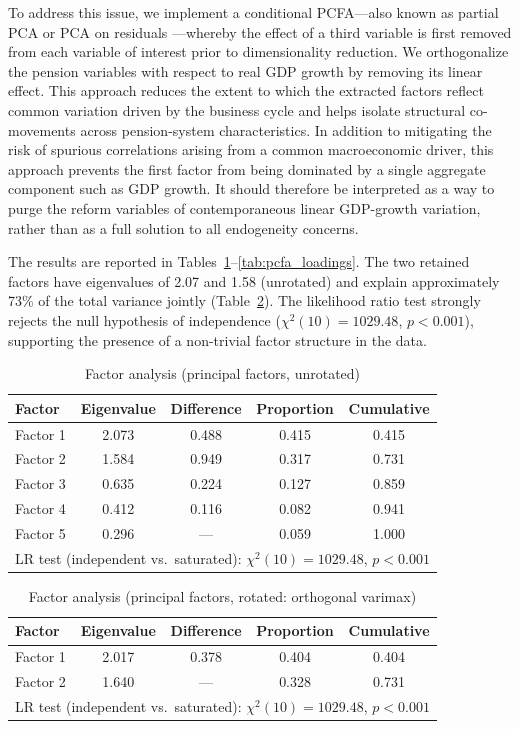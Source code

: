 \documentclass[11pt,english,a4paper, twoside, authoryear]{article}
\begin{document}
To address this issue, we implement a conditional PCFA---also known as partial PCA or PCA on residuals \citep{Boone2020}---whereby the effect of a third variable is first removed from each variable of interest prior to dimensionality reduction. We orthogonalize the pension variables with respect to real GDP growth by removing its linear effect. This approach reduces the extent to which the extracted factors reflect common variation driven by the business cycle and helps isolate structural co-movements across pension-system characteristics. In addition to mitigating the risk of spurious correlations arising from a common macroeconomic driver, this approach prevents the first factor from being dominated by a single aggregate component such as GDP growth. It should therefore be interpreted as a way to purge the reform variables of contemporaneous linear GDP-growth variation, rather than as a full solution to all endogeneity concerns.

The results are reported in Tables~\ref{tab:pcfa_unrot}--\ref{tab:pcfa_loadings}. The two retained factors have eigenvalues of 2.07 and 1.58 (unrotated) and explain approximately 73\% of the total variance jointly (Table~\ref{tab:pcfa_rot}). The likelihood ratio test strongly rejects the null hypothesis of independence ($\chi^2(10) = 1029.48$, $p < 0.001$), supporting the presence of a non-trivial factor structure in the data.

\begin{table}[h!]
\centering
\caption{Factor analysis (principal factors, unrotated)}
\label{tab:pcfa_unrot}
\begin{tabular}{lcccc}
\hline\hline
Factor & Eigenvalue & Difference & Proportion & Cumulative \\
\hline
Factor 1 & 2.073 & 0.488 & 0.415 & 0.415 \\
Factor 2 & 1.584 & 0.949 & 0.317 & 0.731 \\
Factor 3 & 0.635 & 0.224 & 0.127 & 0.859 \\
Factor 4 & 0.412 & 0.116 & 0.082 & 0.941 \\
Factor 5 & 0.296 & ---   & 0.059 & 1.000 \\
\hline
\multicolumn{5}{l}{\scriptsize LR test (independent vs.\ saturated): $\chi^2(10) = 1029.48$, $p < 0.001$} \\
\hline\hline
\end{tabular}
\end{table}

\begin{table}[h!]
\centering
\caption{Factor analysis (principal factors, rotated: orthogonal varimax)}
\label{tab:pcfa_rot}
\begin{tabular}{lcccc}
\hline\hline
Factor & Eigenvalue & Difference & Proportion & Cumulative \\
\hline
Factor 1 & 2.017 & 0.378 & 0.404 & 0.404 \\
Factor 2 & 1.640 & ---   & 0.328 & 0.731 \\
\hline
\multicolumn{5}{l}{\scriptsize LR test (independent vs.\ saturated): $\chi^2(10) = 1029.48$, $p < 0.001$} \\
\hline\hline
\end{tabular}
\end{table}
\end{document}
